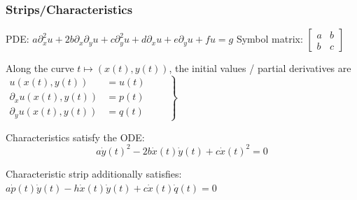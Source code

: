 \subsubsection{Strips/Characteristics}
PDE: $a\partial_x^2u+2b\partial_x\partial_yu+c\partial_y^2u+d\partial_xu+e\partial_yu+fu=g$ Symbol matrix: $ 
	\begin{bmatrix}
		a & b\\
		b & c
	\end{bmatrix}$

Along the curve $t\mapsto(x(t),y(t))$, the initial values / partial derivatives are
$
\left.
\begin{aligned}
u(x(t),y(t))&=u(t)\\
\partial_xu(x(t),y(t))&=p(t)\\
\partial_yu(x(t),y(t))&=q(t)
\end{aligned}
\qquad
\right\}
\label{charanfangs}
$

Characteristics satisfy the ODE:
\[
	a\dot y(t)^2-2b\dot x(t)\dot y(t)+c\dot x(t)^2=0
\]

Characteristic strip additionally satisfies: $a\dot p(t)\dot y(t)-h\dot x(t)\dot y(t)+c\dot x(t)\dot q(t)=0$
